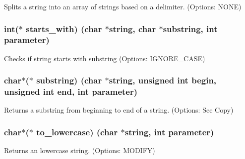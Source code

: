 Splits a string into an array of strings based on a delimiter. (Options\+: N\+O\+N\+E) 

\hypertarget{struct_string___utils_a2e0c72da8d89b7706e0dde7b033f6f6c}{}
\subsubsection[{starts\+\_\+with}]{\setlength{\rightskip}{0pt plus 5cm}int($\ast$ starts\+\_\+with) (char $\ast$string, char $\ast${\bf substring}, int parameter)}\label{struct_string___utils_a2e0c72da8d89b7706e0dde7b033f6f6c}


Checks if string starts with substring (Options\+: I\+G\+N\+O\+R\+E\+\_\+\+C\+A\+S\+E) 

\hypertarget{struct_string___utils_a381c718b857c1e1791c0528134a53947}{}
\subsubsection[{substring}]{\setlength{\rightskip}{0pt plus 5cm}char$\ast$($\ast$ substring) (char $\ast$string, unsigned int begin, unsigned int end, int parameter)}\label{struct_string___utils_a381c718b857c1e1791c0528134a53947}


Returns a substring from beginning to end of a string. (Options\+: See Copy) 

\hypertarget{struct_string___utils_a9171295acb6faebe83a9748eb54fac9f}{}
\subsubsection[{to\+\_\+lowercase}]{\setlength{\rightskip}{0pt plus 5cm}char$\ast$($\ast$ to\+\_\+lowercase) (char $\ast$string, int parameter)}\label{struct_string___utils_a9171295acb6faebe83a9748eb54fac9f}


Returns an lowercase string. (Options\+: M\+O\+D\+I\+F\+Y) 

\hypertarget{struct_string___utils_ad0509a3af747c289031c30a2090b51e4}{}
